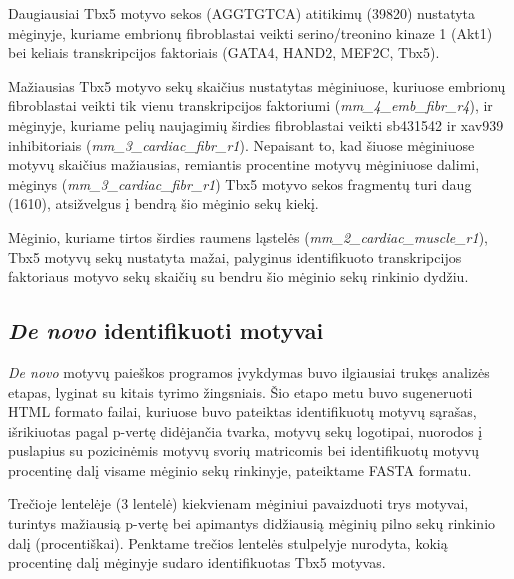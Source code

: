 \documentclass[12pt]{article}
\begin{document}
Daugiausiai Tbx5 motyvo sekos (AGGTGTCA) atitikimų (39820) nustatyta mėginyje,
kuriame embrionų fibroblastai veikti serino/treonino kinaze 1 (Akt1) bei
keliais transkripcijos faktoriais (GATA4, HAND2, MEF2C, Tbx5).

Mažiausias Tbx5 motyvo sekų skaičius nustatytas mėginiuose, kuriuose embrionų
fibroblastai veikti tik vienu transkripcijos faktoriumi
(\small\emph{mm\_4\_emb\_fibr\_r4}), ir mėginyje, kuriame pelių naujagimių
širdies fibroblastai veikti sb431542 ir xav939 inhibitoriais
(\small\emph{mm\_3\_cardiac\_fibr\_r1}). Nepaisant to, kad šiuose mėginiuose
motyvų skaičius mažiausias, remiantis procentine motyvų mėginiuose dalimi,
mėginys (\small\emph{mm\_3\_cardiac\_fibr\_r1}) Tbx5 motyvo sekos fragmentų turi
daug (1610), atsižvelgus į bendrą šio mėginio sekų kiekį.

Mėginio, kuriame tirtos širdies raumens ląstelės
(\small\emph{mm\_2\_cardiac\_muscle\_r1}), Tbx5 motyvų sekų nustatyta mažai,
palyginus identifikuoto transkripcijos faktoriaus motyvo sekų skaičių su bendru
šio mėginio sekų rinkinio dydžiu.

\newpage

\subsection{\emph{De novo} identifikuoti motyvai}
\emph{De novo} motyvų paieškos programos įvykdymas buvo ilgiausiai trukęs
analizės etapas, lyginat su kitais  tyrimo žingsniais. Šio etapo metu buvo
sugeneruoti HTML formato failai, kuriuose buvo pateiktas identifikuotų motyvų
sąrašas, išrikiuotas pagal p-vertę didėjančia tvarka, motyvų sekų logotipai,
nuorodos į puslapius su pozicinėmis motyvų svorių matricomis bei identifikuotų
motyvų procentinę dalį visame mėginio sekų rinkinyje, pateiktame FASTA formatu.

Trečioje lentelėje (3 lentelė) kiekvienam mėginiui pavaizduoti trys motyvai,
turintys mažiausią p-vertę bei apimantys didžiausią mėginių pilno sekų rinkinio
dalį (procentiškai). Penktame trečios lentelės stulpelyje nurodyta, kokią
procentinę dalį mėginyje sudaro identifikuotas Tbx5 motyvas.
\end{document}
